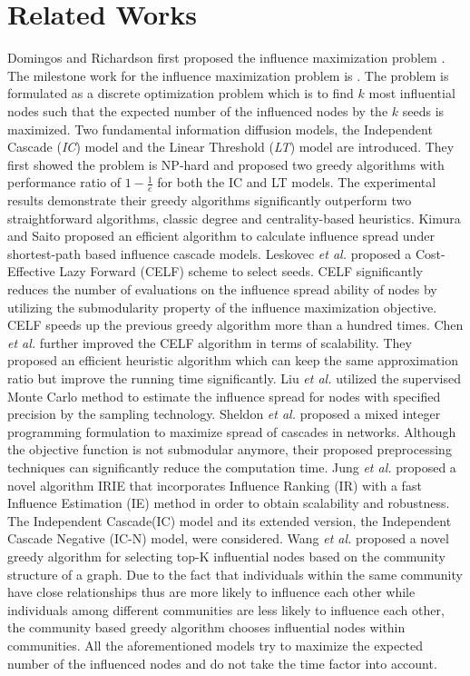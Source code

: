 \section{Related Works}
\label{sec:1}
Domingos and Richardson first proposed the influence maximization problem \cite{RD2002}.
The milestone work for the influence maximization problem is \cite{KKT2003}.
The problem is formulated as a discrete optimization problem which is to find $k$ most influential nodes such that the expected number of the influenced nodes by the $k$ seeds is maximized.
Two fundamental information diffusion models, the Independent Cascade (\emph{IC}) model and the Linear Threshold (\emph{LT}) model are introduced.
They first showed the problem is NP-hard and proposed two greedy algorithms with performance ratio of $1-\frac{1}{e}$ for both the IC and LT models.
The experimental results demonstrate their greedy algorithms significantly outperform two straightforward algorithms, classic degree and centrality-based heuristics.
Kimura and Saito \cite{KS2006} proposed an efficient algorithm to calculate influence spread under shortest-path based influence cascade models.
Leskovec {\it et al.} \cite{LKG2007} proposed a Cost-Effective Lazy Forward (CELF) scheme to select seeds.
CELF significantly reduces the number of evaluations on the influence spread ability of nodes by utilizing the submodularity property of the influence maximization objective.
CELF speeds up the previous greedy algorithm more than a hundred times.
Chen {\it et al.} \cite{CWY2009} further improved the CELF algorithm in terms of scalability.
They proposed an efficient heuristic algorithm which can keep the same approximation ratio but improve the running time significantly.
Liu {\it et al.} \cite{LLL2012} utilized the supervised Monte Carlo method to estimate the influence spread for nodes with specified precision by the sampling technology.
Sheldon {\it et al.} \cite{SDE2012} proposed a mixed integer programming formulation to maximize spread of cascades in networks.
Although the objective function is not submodular anymore, their proposed preprocessing techniques can significantly reduce the computation time.
Jung {\it et al.} \cite{JHC2011} proposed a novel algorithm IRIE that incorporates Influence Ranking (IR) with a fast Influence Estimation (IE) method
in order to obtain scalability and robustness.
The Independent Cascade(IC) model and its extended version, the Independent Cascade Negative (IC-N) model, were considered.
Wang {\it et al.} \cite{WCS2010} proposed a novel greedy algorithm for selecting top-K influential nodes based on the community structure of a graph.
Due to the fact that individuals within the same community have close relationships thus are more likely to influence each other while individuals among different communities
are less likely to influence each other, the community based greedy algorithm chooses influential nodes within communities.
All the aforementioned models try to maximize the expected number of the influenced nodes and do not take the time factor into account.

